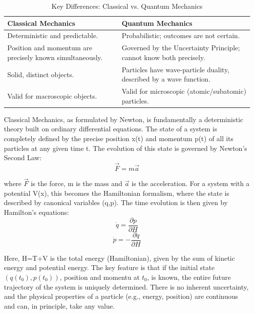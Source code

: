 \documentclass{article}
\begin{document}
\begin{table}[h]
\centering
\caption{Key Differences: Classical vs. Quantum Mechanics}
\label{tab:differences}
\begin{tabular}{p{} p{}}
\toprule
\textbf{Classical Mechanics} & \textbf{Quantum Mechanics} \\
\midrule
Deterministic and predictable. & Probabilistic; outcomes are not certain. \\
Position and momentum are precisely known simultaneously. & Governed by the Uncertainty Principle; cannot know both precisely. \\
Solid, distinct objects. & Particles have wave-particle duality, described by a wave function. \\
Valid for macroscopic objects. & Valid for microscopic (atomic/subatomic) particles. \\
\bottomrule
\end{tabular}
\end{table}
Classical Mechanics, as formulated by Newton, is fundamentally a deterministic theory built on ordinary differential equations. The state of a system is completely defined by the precise position x(t) and momentum p(t) of all its particles at any given time t. The evolution of this state is governed by Newton's Second Law:
\begin{equation}
    \vec{F} = m \vec{a} 
\end{equation}

where $\vec{F}$ is the force, m is the mass and $\vec{a}$ is the acceleration.
For a system with a potential V(x), this becomes the Hamiltonian formalism, where the state is described by canonical variables (q,p). The time evolution is then given by Hamilton's equations:
\begin{equation}
    \dot{q} = \frac{\partial p}{\partial H}
\end{equation}
\begin{equation}
    \dot{p} = - \frac{\partial q}{\partial H}
\end{equation}

Here, H=T+V is the total energy (Hamiltonian), given by the sum of kinetic energy and potential energy. The key feature is that if the initial state $(q(t_0),p(t_0))$, position and momentu at $t_0$, is known, the entire future trajectory of the system is uniquely determined. There is no inherent uncertainty, and the physical properties of a particle (e.g., energy, position) are continuous and can, in principle, take any value.
\end{document}
